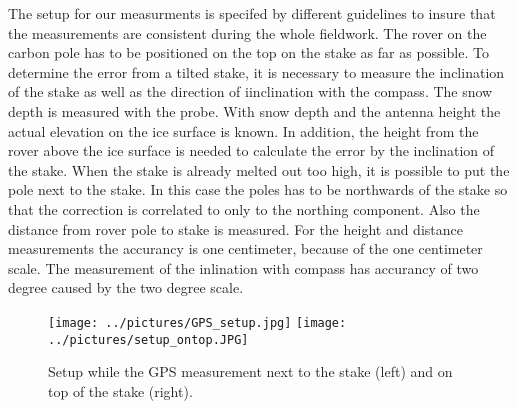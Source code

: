 The setup for our measurments is specifed by different guidelines to insure that the measurements are consistent during the whole fieldwork.
The rover on the carbon pole has to be positioned on the top on the stake as far as possible. 
To determine the error from a tilted stake, it is necessary to measure the inclination of the stake as well as the direction of iinclination with the compass.
The snow depth is measured with the probe.
With snow depth and the antenna height the actual elevation on the ice surface is known. 
In addition, the height from the rover above the ice surface is needed to calculate the error by the inclination of the stake.
When the stake is already melted out too high, it is possible to put the pole next to the stake. 
In this case the poles has to be northwards of the stake so that the correction is correlated to only to the northing component. 
Also the distance from rover pole to stake is measured.
For the height and distance measurements the accurancy is one centimeter, because of the one centimeter scale.
The measurement of the inlination with compass has accurancy of two degree caused by the two degree scale.

\begin{figure}
\centering
\texttt{[image: ../pictures/GPS\_setup.jpg]}
\texttt{[image: ../pictures/setup\_ontop.JPG]}
\caption{Setup while the GPS measurement next to the stake (left) and on top of the stake (right).}
\end{figure}

